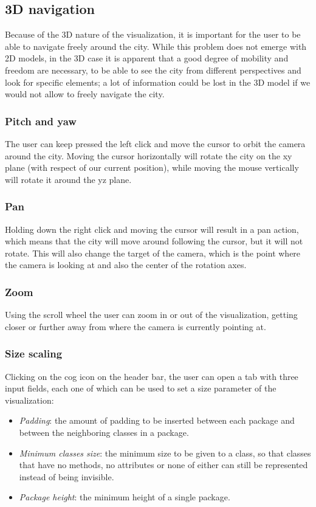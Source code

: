 \documentclass[]{usiinfbachelorproject}
\begin{document}
\subsection{3D navigation} \label{3D navigation}
Because of the 3D nature of the visualization, it is important for the user to be able to navigate freely around the city. While this problem does not emerge with 2D models, in the 3D case it is apparent that a good
degree of mobility and freedom are necessary, to be able to see the city from different perspectives and look for specific elements; a lot of information could be lost in the 3D model if we would not allow to freely navigate the city.


\subsubsection{Pitch and yaw} \label{Pitch and yaw}
The user can keep pressed the left click and move the cursor to orbit the camera around the city. Moving the cursor horizontally will rotate the city on the xy plane (with respect of our current position), while
moving the mouse vertically will rotate it around the yz plane.

\subsubsection{Pan} \label{Pan}
Holding down the right click and moving the cursor will result in a pan action, which means that the city will move around following the cursor, but it will not rotate. This will also change the target of the camera,
 which is the point where the camera is looking at and also the center of the rotation axes.

 \subsubsection{Zoom} \label{Zoom}
Using the scroll wheel the user can zoom in or out of the visualization, getting closer or further away from where the camera is currently pointing at.

\subsubsection{Size scaling} \label{Size scaling}
Clicking on the cog icon on the header bar, the user can open a tab with three input fields, each one of which can be used to set a size parameter of the visualization:

\begin{itemize}
\item \textit{Padding}: the amount of padding to be inserted between each package and between the neighboring classes in a package.
\item \textit{Minimum classes size}: the minimum size to be given to a class, so that classes that have no methods, no attributes or none of either can still be represented instead of being invisible.
\item \textit{Package height}: the minimum height of a single package.
\end{itemize}
\end{document}
